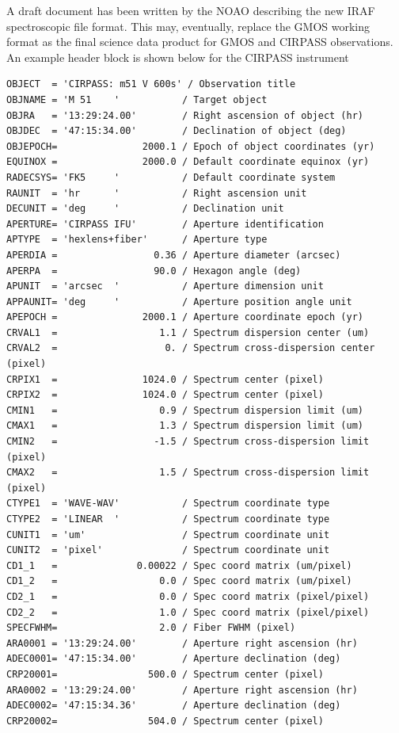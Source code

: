 \documentclass[twoside,11pt]{article}
\newcommand{\htmladdnormallink}[2]{#1}
\newcommand{\htmlref}[2]{#1}
\begin{document}
A draft document has been written by the NOAO describing the new IRAF \htmladdnormallink{spectroscopic file format}{http://iraf.noao.edu/projects/ccdmosaic/imagedef/spec2d.html}. This may, eventually, replace the GMOS \htmlref{working format}{sc16_gmos} as the final science data product for \htmlref{GMOS}{sc16_gmos} and \htmlref{CIRPASS}{sc16_cirpass} observations. An example header block is shown below for the CIRPASS instrument

\small\begin{verbatim}
OBJECT  = 'CIRPASS: m51 V 600s' / Observation title
OBJNAME = 'M 51    '           / Target object
OBJRA   = '13:29:24.00'        / Right ascension of object (hr)
OBJDEC  = '47:15:34.00'        / Declination of object (deg)
OBJEPOCH=               2000.1 / Epoch of object coordinates (yr)
EQUINOX =               2000.0 / Default coordinate equinox (yr)
RADECSYS= 'FK5     '           / Default coordinate system
RAUNIT  = 'hr      '           / Right ascension unit
DECUNIT = 'deg     '           / Declination unit
APERTURE= 'CIRPASS IFU'        / Aperture identification
APTYPE  = 'hexlens+fiber'      / Aperture type
APERDIA =                 0.36 / Aperture diameter (arcsec)
APERPA  =                 90.0 / Hexagon angle (deg)
APUNIT  = 'arcsec  '           / Aperture dimension unit
APPAUNIT= 'deg     '           / Aperture position angle unit
APEPOCH =               2000.1 / Aperture coordinate epoch (yr)
CRVAL1  =                  1.1 / Spectrum dispersion center (um)
CRVAL2  =                   0. / Spectrum cross-dispersion center (pixel)
CRPIX1  =               1024.0 / Spectrum center (pixel)
CRPIX2  =               1024.0 / Spectrum center (pixel)
CMIN1   =                  0.9 / Spectrum dispersion limit (um)
CMAX1   =                  1.3 / Spectrum dispersion limit (um)
CMIN2   =                 -1.5 / Spectrum cross-dispersion limit (pixel)
CMAX2   =                  1.5 / Spectrum cross-dispersion limit (pixel)
CTYPE1  = 'WAVE-WAV'           / Spectrum coordinate type
CTYPE2  = 'LINEAR  '           / Spectrum coordinate type
CUNIT1  = 'um'                 / Spectrum coordinate unit
CUNIT2  = 'pixel'              / Spectrum coordinate unit
CD1_1   =              0.00022 / Spec coord matrix (um/pixel)
CD1_2   =                  0.0 / Spec coord matrix (um/pixel)
CD2_1   =                  0.0 / Spec coord matrix (pixel/pixel)
CD2_2   =                  1.0 / Spec coord matrix (pixel/pixel)
SPECFWHM=                  2.0 / Fiber FWHM (pixel)
ARA0001 = '13:29:24.00'        / Aperture right ascension (hr)
ADEC0001= '47:15:34.00'        / Aperture declination (deg)
CRP20001=                500.0 / Spectrum center (pixel)
ARA0002 = '13:29:24.00'        / Aperture right ascension (hr)
ADEC0002= '47:15:34.36'        / Aperture declination (deg)
CRP20002=                504.0 / Spectrum center (pixel)
\end{verbatim}\normalsize
\end{document}
